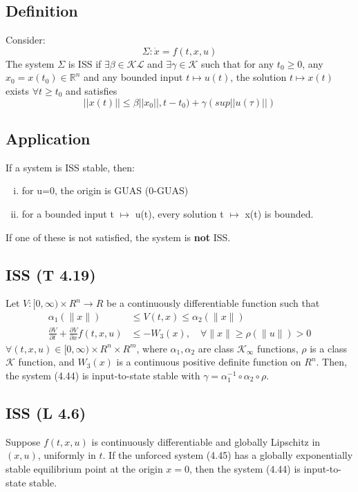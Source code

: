 \documentclass{article}
\begin{document}
\subsection{Definition}
Consider:
\begin{equation}
	\Sigma : \dot x = f(t, x, u)
\end{equation}
The system $\Sigma$ is ISS if $\exists\beta \in \mathcal{K} \mathcal{L}$ and $\exists\gamma \in \mathcal{K}$ such that for any $t_0 \geq 0$, any $x_0 = x(t_0) \in \mathbb{R}^n$ and any bounded input $t \mapsto u(t)$, the solution $t\mapsto x(t)$ exists $\forall t \geq t_0$ and satisfies
\begin{equation}
	||x(t)||\leq\beta||x_0||,t-t_0)+\gamma(sup||u(\tau)||)
\end{equation}
\subsection{Application}
If a system is ISS stable, then:
\begin{enumerate}[i)]
	\item for u=0, the origin is GUAS (0-GUAS)
	\item for a bounded input t $\mapsto$ u(t), every solution t $\mapsto$ x(t) is bounded.
\end{enumerate}
If one of these is not satisfied, the system is \textbf{not} ISS.
\subsection{ISS (T 4.19)}
Let $V:[0, \infty) \times R^n \rightarrow R$ be a continuously differentiable function such that
$$
\begin{aligned}
\alpha_1(\|x\|) & \leq V(t, x) \leq \alpha_2(\|x\|) \\
\frac{\partial V}{\partial t}+\frac{\partial V}{\partial x} f(t, x, u) & \leq-W_3(x), \quad \forall\|x\| \geq \rho(\|u\|)>0
\end{aligned}
$$
$\forall(t, x, u) \in[0, \infty) \times R^n \times R^m$, where $\alpha_1, \alpha_2$ are class $\mathcal{K}_{\infty}$ functions, $\rho$ is a class $\mathcal{K}$ function, and $W_3(x)$ is a continuous positive definite function on $R^n$. Then, the system (4.44) is input-to-state stable with $\gamma=\alpha_1^{-1} \circ \alpha_2 \circ \rho$.
\subsection{ISS (L 4.6)}
Suppose $f(t, x, u)$ is continuously differentiable and globally Lipschitz in $(x, u)$, uniformly in $t$. If the unforced system (4.45) has a globally exponentially stable equilibrium point at the origin $x=0$, then the system (4.44) is input-to-state stable.
\end{document}

